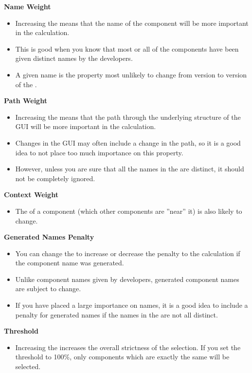 \begin{enumerate}
\textbf{Name Weight}
\begin{itemize}
\item Increasing the  means that the name of the component will be more important in the calculation. 
\item This is good when you know that most or all of the components have been given distinct names by the developers. 
\item A given name is the property most unlikely to change from version to version of the \gdaut{}. 
\end{itemize}
\textbf{Path Weight}
\begin{itemize}
\item Increasing the  means that the path through the underlying structure of the GUI will be more important in the calculation.
\item Changes in the GUI may often include a change in the path, so it is a good idea to not place too much importance on this property. 
\item However, unless you are sure that all the names in the \gdaut are distinct, it should not be completely ignored. 
\end{itemize}
\textbf{Context Weight}
\begin{itemize}
\item The  of a component (which other components are ''near'' it) is also likely to change. 
\end{itemize}
\textbf{Generated Names Penalty}
\begin{itemize}
 \item You can change the  to increase or decrease the penalty to the calculation if the component name was generated. 
 \item Unlike component names given by developers, generated component names  are subject to change. 
 \item If you have placed a large importance on names, it is a good idea to include a penalty for generated names if the names in the \gdaut{} are not all distinct. 
\end{itemize}
\textbf{Threshold}
\begin{itemize}
 \item Increasing the  increases the overall strictness of the selection. If you set the threshold to 100\%, only components which are exactly the same will be selected. 
\end{itemize}
\end{enumerate}

